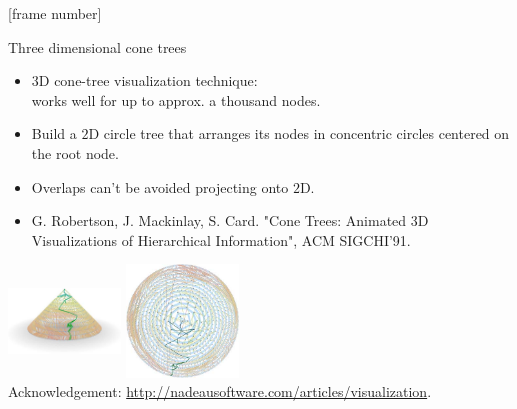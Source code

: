 \documentclass[aspectratio=169,t]{beamer}
\begin{document}
  {
    [frame number]
    \begin{frame}{Three dimensional cone trees}
    \centering
    \begin{itemize}
      \item $3$D cone-tree visualization technique:\\
            works well for up to approx. a thousand nodes.
      \item Build a $2$D circle tree that arranges its nodes in concentric circles centered on the root node.
      \item Overlaps can't be avoided projecting onto $2$D.
      \item G. Robertson, J. Mackinlay, S. Card. "Cone Trees: Animated 3D Visualizations of Hierarchical Information", ACM SIGCHI'91.
    \end{itemize}
    \vspace{0.2cm}
    \includegraphics[width=3cm,height=3cm]{img/threedcone_one.jpg}\hspace{1cm}
    \includegraphics[width=3cm,height=3cm]{img/threedcone_two.jpg}\\
    \tiny{Acknowledgement: \href{ttp://nadeausoftware.com/articles/visualization}{http://nadeausoftware.com/articles/visualization}.}
    \end{frame}
  }
\end{document}
